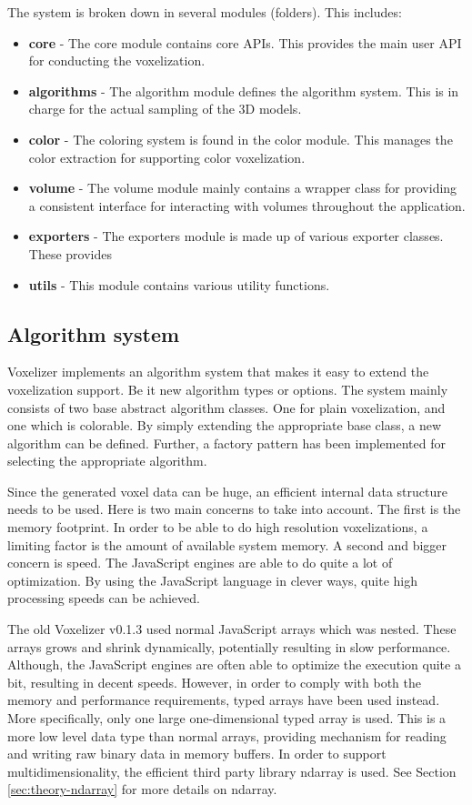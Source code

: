 The system is broken down in several modules (folders). This includes:
\begin{itemize}
    \item \textbf{core} - The core module contains core APIs. This provides the main user API for conducting the voxelization.
    \item \textbf{algorithms} - The algorithm module defines the algorithm system. This is in charge for the actual sampling of the 3D models.
    \item \textbf{color} - The coloring system is found in the color module. This manages the color extraction for supporting color voxelization.
    \item \textbf{volume} - The volume module mainly contains a wrapper class for providing a consistent interface for interacting with volumes throughout the application.  
    \item \textbf{exporters} - The exporters module is made up of various exporter classes. These provides 
    \item \textbf{utils} - This module contains various utility functions.
\end{itemize}

\subsection{Algorithm system}
Voxelizer implements an algorithm system that makes it easy to extend the voxelization support. Be it new algorithm types or options. The system mainly consists of two base abstract algorithm classes. One for plain voxelization, and one which is colorable. By simply extending the appropriate base class, a new algorithm can be defined. Further, a factory pattern has been implemented for selecting the appropriate algorithm.

Since the generated voxel data can be huge, an efficient internal data structure needs to be used. Here is two main concerns to take into account. The first is the memory footprint. In order to be able to do high resolution voxelizations, a limiting factor is the amount of available system memory. A second and bigger concern is speed. The JavaScript engines are able to do quite a lot of optimization. By using the JavaScript language in clever ways, quite high processing speeds can be achieved.

The old Voxelizer v0.1.3 used normal JavaScript arrays which was nested. These arrays grows and shrink dynamically, potentially resulting in slow performance. Although, the JavaScript engines are often able to optimize the execution quite a bit, resulting in decent speeds. However, in order to comply with both the memory and performance requirements, typed arrays have been used instead. More specifically, only one large one-dimensional typed array is used. This is a more low level data type than normal arrays, providing mechanism for reading and writing raw binary data in memory buffers. In order to support multidimensionality, the efficient third party library ndarray is used. See Section \ref{sec:theory-ndarray} for more details on ndarray.

